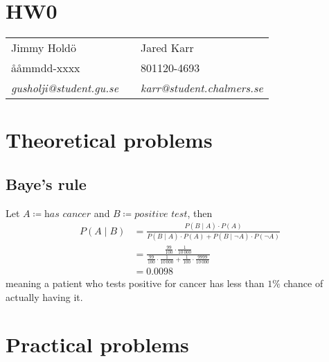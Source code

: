 \documentclass[a4paper,11pt]{article}
\DeclareMathOperator{\given}{\mid}
\begin{document}
\section*{HW0}

\begin{tabular*}{0.9\textwidth}{@{\extracolsep{\fill} } lll}
Jimmy Hold\"{o} & & Jared Karr\\
\aa\aa mmdd-xxxx & & 801120-4693\\
\it{gusholji@student.gu.se} & & \it{karr@student.chalmers.se}\\
\end{tabular*}

\section{Theoretical problems}
\subsection{Baye's rule}
Let $A\coloneqq\textit{has cancer}$ and $B\coloneqq\textit{positive test}$, then
\begin{align*}
P(A \given B) &= \frac{P(B \given A)\cdot P(A)}{P(B \given A)\cdot P(A)+P(B \given \neg A)\cdot P(\neg A)}  \\
              &= \frac{\frac{99}{100}\cdot\frac{1}{10\,000}}{\frac{99}{100}\cdot\frac{1}{10\,000}+\frac{1}{100}\cdot\frac{9999}{10\,000}} \\
              &= 0.0098
\end{align*}
meaning a patient who tests positive for cancer has less than $1\%$ chance of actually having it.

\subsection{}

\section{Practical problems}
\subsection{}
\subsection{}
\end{document}

